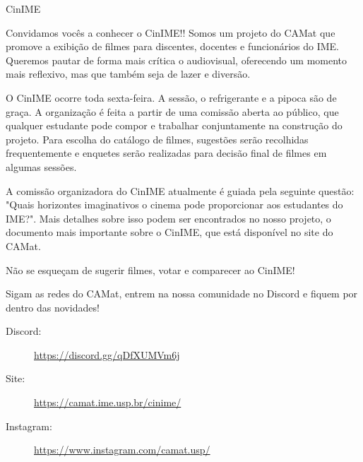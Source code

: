 \begin{subsecao}{CinIME}


Convidamos vocês a conhecer o CinIME!! Somos um projeto do CAMat que promove a
exibição de filmes para discentes, docentes e funcionários do IME. Queremos pautar
de forma mais crítica o audiovisual, oferecendo um momento mais reflexivo, mas que 
também seja de lazer e diversão.

O CinIME ocorre toda sexta-feira. A sessão, o refrigerante e a pipoca são de graça. 
A organização é feita a partir de uma comissão aberta ao público, que
qualquer estudante pode compor e trabalhar conjuntamente na construção do projeto. 
Para escolha do catálogo de filmes, sugestões serão recolhidas
frequentemente e enquetes serão realizadas para decisão final de filmes em algumas
sessões.

A comissão organizadora do CinIME atualmente é guiada pela seguinte questão: "Quais 
horizontes imaginativos o cinema pode proporcionar aos estudantes do IME?". Mais detalhes
sobre isso podem ser encontrados no nosso projeto, o documento mais importante sobre o 
CinIME, que está disponível no site do CAMat.

Não se esqueçam de sugerir filmes, votar e comparecer ao CinIME!

Sigam as redes do CAMat, entrem na nossa comunidade no Discord e fiquem por dentro das novidades!

\begin{description}
  \item[Discord:] \url{https://discord.gg/qDfXUMVm6j}
  \item[Site:] \url{https://camat.ime.usp.br/cinime/}
  \item[Instagram:] \url{https://www.instagram.com/camat.usp/}
\end{description}

\end{subsecao}
